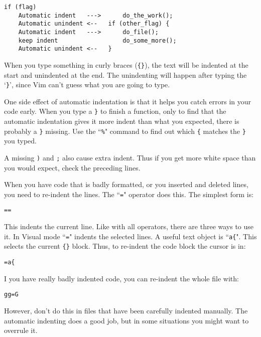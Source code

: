 \begin{Verbatim}[samepage=true]
                             if (flag)
    Automatic indent   --->      do_the_work();
    Automatic unindent <--   if (other_flag) {
    Automatic indent   --->      do_file();
    keep indent                  do_some_more();
    Automatic unindent <--   }
\end{Verbatim}

When you type something in curly braces (\texttt{\{\}}), the text will be indented at the start and unindented at the end.
The unindenting will happen after typing the `\texttt{\}}', since Vim can't guess what you are going to type.

One side effect of automatic indentation is that it helps you catch errors in your code early.
When you type a \texttt{\}} to finish a function, only to find that the automatic indentation gives it more indent than what you expected, there is probably a \texttt{\}} missing.
Use the ``\texttt{\%}" command to find out which \texttt{\{} matches the \texttt{\}} you typed.

A missing \texttt{)} and \texttt{;} also cause extra indent.
Thus if you get more white space than you would expect, check the preceding lines.

When you have code that is badly formatted, or you inserted and deleted lines, you need to re-indent the lines.
The ``\texttt{=}" operator does this.
The simplest form is:

\begin{Verbatim}[samepage=true]
 ==
\end{Verbatim}

This indents the current line.
Like with all operators, there are three ways to use it.
In Visual mode ``\texttt{=}" indents the selected lines.
A useful text object is ``\texttt{a\{}".
This selects the current \texttt{\{\}} block.
Thus, to re-indent the code block the cursor is in:

\begin{Verbatim}[samepage=true]
 =a{
\end{Verbatim}

I you have really badly indented code, you can re-indent the whole file with:

\begin{Verbatim}[samepage=true]
 gg=G
\end{Verbatim}

However, don't do this in files that have been carefully indented manually.
The automatic indenting does a good job, but in some situations you might want to overrule it.

